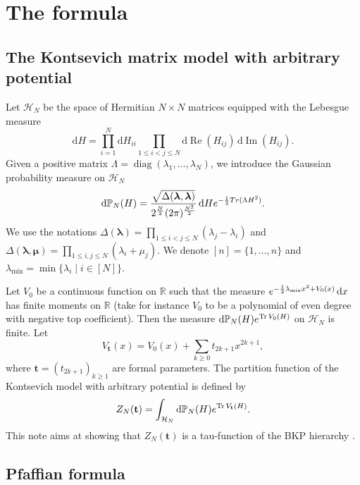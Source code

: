 \documentclass[11pt]{article}
\numberwithin{equation}{section}
\numberwithin{equation}{section}
\newcommand{\dd}{\mathrm{d}}
\begin{document}
\section{The formula}\label{Chap1}

\subsection{The Kontsevich matrix model with arbitrary potential}

Let $\mathcal{H}_N$ be the space of Hermitian $N \times N$ matrices
equipped with the Lebesgue measure
\[
\dd H= \prod_{i=1}^N \dd H_{ii}
 \prod_{1 \leq i < j \leq N} \dd\operatorname{Re}(H_{ij})\, \dd\operatorname{Im}(H_{ij}).
\]
Given a positive matrix $\Lambda = \operatorname{diag}(\lambda_1,\dots,\lambda_N)$,
we introduce the Gaussian probability measure on $\mathcal{H}_N$
\begin{equation}
\label{theGauss}
\dd \mathbb{P}_N(H) = \frac{\sqrt{\Delta(\boldsymbol{\lambda},\boldsymbol{\lambda})}}{2^{\frac{N}{2}} (2\pi)^{\frac{N^2}{2}}}\,\dd H {\rm e}^{-\frac{1}{2}{\rm Tr}(\Lambda H^2)}.
\end{equation}
We use the notations $\Delta(\boldsymbol{\lambda}) = \prod_{1 \leq i < j \leq N} (\lambda_j - \lambda_i)$ and $\Delta(\boldsymbol{\lambda},\boldsymbol{\mu}) = \prod_{1 \leq i,j \leq N} (\lambda_i + \mu_j)$. We denote $[n] = \{1,\dots,n\}$ and $\lambda_{\min} = \min\{\lambda_i\mid i \in [N]\}$.

Let $V_0$ be a continuous function on $\mathbb{R}$ such that the measure ${\rm e}^{- \frac{1}{2}\lambda_{\min} x^2 + V_0(x)}\,\dd x$ has finite moments on $\mathbb{R}$ (take for instance $V_0$ to be a polynomial of even degree with negative top coefficient). Then the measure $\dd \mathbb{P}_N(H) {\rm e}^{ \operatorname{Tr}V_0(H)}$ on $\mathcal{H}_N$ is finite. Let
\[
V_{\mathbf{t}}(x) = V_0(x) + \sum_{k \geq 0} t_{2k + 1} x^{2k + 1},
\]
where $\mathbf{t} = (t_{2k + 1})_{k \geq 1}$ are formal parameters. The partition function of the Kontsevich model with arbitrary potential is defined by
\begin{equation}
\label{Zdef} Z_N(\mathbf{t}) = \int_{\mathcal{H}_N} \dd\mathbb{P}_N(H) {\rm e}^{\operatorname{Tr}V_{\mathbf{t}}(H)}.
\end{equation}
This note aims at showing that $Z_N(\mathbf{t})$ is a
tau-function of the BKP hierarchy \cite{Date:1981qz}.

\subsection{Pfaffian formula}
\end{document}
